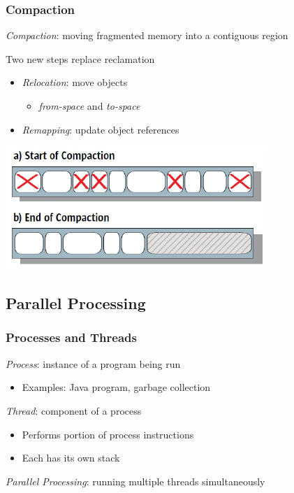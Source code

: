 \documentclass{beamer}
\newcommand{\linespace}{\vskip 0.25cm}
\begin{document}
\begin{frame}

\frametitle{Compaction}


\emph{Compaction}: moving fragmented memory into a contiguous region

\linespace

Two new steps replace reclamation
\begin{itemize}
\item \emph{Relocation}: move objects 
\begin{itemize}
\item \emph{from-space} and \emph{to-space}
\end{itemize}
\item \emph{Remapping}: update object references
\end{itemize}

\linespace

\begin{center}
\includegraphics[width=.60\textwidth]{Illustrations/bg_compaction.pdf}
\end{center}

\end{frame}



\subsection[PP Basics]{Parallel Processing}

\begin{frame}

\frametitle{Processes and Threads}

\emph{Process}: instance of a program being run
\begin{itemize}
\item Examples: Java program, garbage collection
\end{itemize}

\linespace
\linespace

\emph{Thread}: component of a process
\begin{itemize}
\item Performs portion of process instructions %
\item Each has its own stack
\end{itemize}

\linespace
\linespace

\emph{Parallel Processing}: running multiple threads simultaneously

\end{frame}
\end{document}
